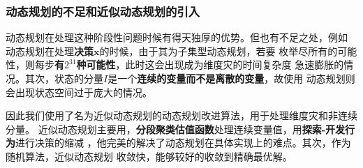 \documentclass{cumcmthesis}
\begin{document}
\subsubsection*{动态规划的不足和近似动态规划的引入}
动态规划在处理这种阶段性问题时候有得天独厚的优势。但也有不足之处，例如
动态规划在处理\textbf{决策$\bm{x}$}的时候，由于其为子集型动态规划，若要
枚举尽所有的可能性，则每步\textbf{有$2^{31}$种可能性}，此时这会出现成为维度灾的时间复杂度
急速膨胀的情况。其次，状态的分量$I$是一个\textbf{连续的变量而不是离散的变量}，故使用
动态规划则会出现状态空间过于庞大的情况。\par
因此我们使用了名为近似动态规划\cite{RN10}的动态规划改进算法，用于处理维度灾和非连续分量。
近似动态规划主要用，\textbf{分段聚类估值函数}处理连续变量值，用\textbf{探索-开发行为}进行决策的缩减
，他完美的解决了动态规划在具体实现上的难点。其次，作为随机算法，近似动态规划
收敛快，能够较好的收敛到精确最优解。
\end{document}
